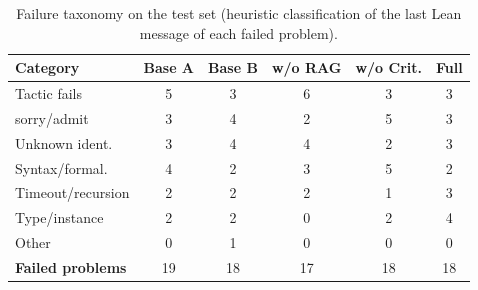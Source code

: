 \begin{table}[t]
\centering
\caption{Failure taxonomy on the test set (heuristic classification of the last Lean message of each failed problem).}
\label{tab:errors}
\footnotesize
\setlength{\tabcolsep}{3pt}
\begin{tabular}{lccccc}
\hline
Category & Base A & Base B & w/o RAG & w/o Crit. & Full \\
\hline
Tactic fails & 5 & 3 & 6 & 3 & 3 \\
sorry/admit & 3 & 4 & 2 & 5 & 3 \\
Unknown ident. & 3 & 4 & 4 & 2 & 3 \\
Syntax/formal. & 4 & 2 & 3 & 5 & 2 \\
Timeout/recursion & 2 & 2 & 2 & 1 & 3 \\
Type/instance & 2 & 2 & 0 & 2 & 4 \\
Other & 0 & 1 & 0 & 0 & 0 \\
\textbf{Failed problems} & 19 & 18 & 17 & 18 & 18 \\
\hline
\end{tabular}
\end{table}
